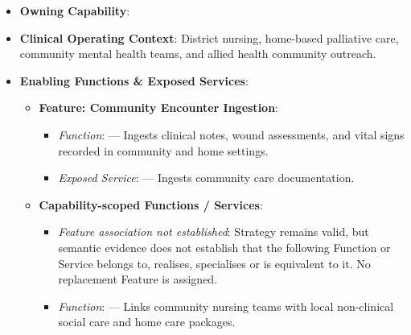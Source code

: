 \begin{itemize}

\item 
\textbf{Owning Capability}: \texttt{}



\item 
\textbf{Clinical Operating Context}: District nursing, home-based palliative care, community mental health teams, and allied health community outreach.



\item 
\textbf{Enabling Functions \& Exposed Services}:


\begin{itemize}

\item 
\textbf{Feature: Community Encounter Ingestion}:


\begin{itemize}

\item 
\emph{Function}: \texttt{} — Ingests clinical notes, wound assessments, and vital signs recorded in community and home settings.



\item 
\emph{Exposed Service}: \texttt{} — Ingests community care documentation.



\end{itemize}


\item 
\textbf{Capability-scoped Functions /\allowbreak{} Services}:


\begin{itemize}

\item 
\emph{Feature association not established}: Strategy \texttt{} remains valid, but semantic evidence does not establish that the following Function or Service belongs to, realises, specialises or is equivalent to it. No replacement Feature is assigned.



\item 
\emph{Function}: \texttt{} — Links community nursing teams with local non-clinical social care and home care packages.




\end{itemize}
\end{itemize}
\end{itemize}

